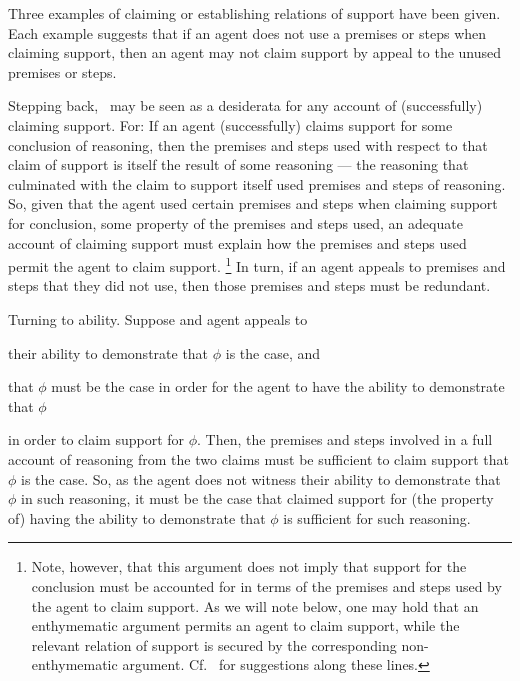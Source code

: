 \begin{note}
  Three examples of claiming or establishing relations of support have been given.
  Each example suggests that if an agent does not use a premises or steps when claiming support, then an agent may not claim support by appeal to the unused premises or steps.

  Stepping back,~\ESU{} may be seen as a desiderata for any account of (successfully) claiming support.
  For:
  If an agent (successfully) claims support for some conclusion of reasoning, then the premises and steps used with respect to that claim of support is itself the result of some reasoning --- the reasoning that culminated with the claim to support itself used premises and steps of reasoning.
  So, given that the agent used certain premises and steps when claiming support for conclusion, some property of the premises and steps used, an adequate account of claiming support must explain how the premises and steps used permit the agent to claim support.\nolinebreak
  \footnote{
    Note, however, that this argument does not imply that support for the conclusion must be accounted for in terms of the premises and steps used by the agent to claim support.
    As we will note below, one may hold that an enthymematic argument permits an agent to claim support, while the relevant relation of support is secured by the corresponding non-enthymematic argument.
    Cf.\ \textcite{Moretti:2019wx} for suggestions along these lines.
  }
  In turn, if an agent appeals to premises and steps that they did not use, then those premises and steps must be redundant.

  Turning to ability.
  Suppose and agent appeals to
  \begin{enumerate*}
  \item their ability to demonstrate that \(\phi\) is the case, and
  \item that \(\phi\) must be the case in order for the agent to have the ability to demonstrate that \(\phi\)
  \end{enumerate*}
  in order to claim support for \(\phi\).
  Then, the premises and steps involved in a full account of reasoning from the two claims must be sufficient to claim support that \(\phi\) is the case.
  So, as the agent does not witness their ability to demonstrate that \(\phi\) in such reasoning, it must be the case that claimed support for (the property of) having the ability to demonstrate that \(\phi\) is sufficient for such reasoning.
\end{note}

